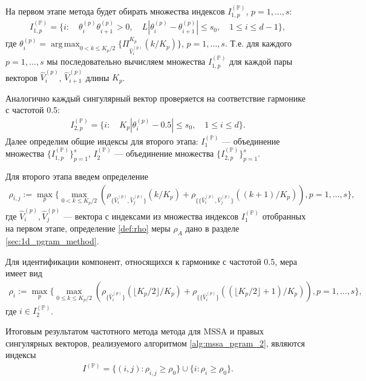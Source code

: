 \documentclass[specialist,
               substylefile = spbu.rtx,
               subf,href,colorlinks=true, 12pt]{disser}
\def\argmax{\mathop{\mathrm{argmax}}}
\def\argmax{\mathop{\mathrm{arg\,max}}}
\begin{document}
На первом этапе метода будет обирать множества индексов $I_{1,p}^{(\mathbb{P})}$, $p=1,\ldots,s$:
\begin{gather} \label{eq:I_1_P_mssa}
I_{1,p}^{(\mathbb{P})} = \{ i: \quad \theta_{i}^{(p)} \theta_{i+1} ^{(p)} >0, \quad L |\theta_i^{(p)} - \theta_{i+1}^{(p)}| \leqslant s_0, \quad 1 \leqslant i \leqslant d -1  \},
\end{gather}
где $\theta_i^{(p)} = \argmax_{0 < k \leqslant K_p/2} \{\Pi_{\widehat{V}_i^{(p)}}^{K_p}(k/{K_p})\}$, $p=1,\ldots,s$.
Т.е. для каждого $p = 1,\ldots,s$
мы последовательно вычисляем множества $I_{1,p}^{(\mathbb{P})}$ для каждой пары векторов  $\widehat{V}_i^{(p)}$, $\widehat{V}_{i+1}^{(p)}$ длины $K_p$.

Аналогично каждый сингулярный вектор проверяется на соответствие гармонике с частотой 0.5:
\begin{gather} \label{eq:I_2_P_mssa}
I_{2,p}^{(\mathbb{P})} = \{i: \quad  {K_p} |\theta_{i}^{(p)} - 0.5 | \leqslant s_0, \quad 1 \leqslant i \leqslant d  \}.
\end{gather}
Далее определим общие индексы для второго этапа: $I_1^{(\mathbb{P})}$ --- объединение множества $\{ I_{1,p}^{(\mathbb{P})} \}_{p=1}^{s}$, $I_2^{(\mathbb{P})}$ --- объединение множества $\{ I_{2,p}^{(\mathbb{P})} \}_{p=1}^{s}$.

Для второго этапа введем определение
\begin{gather*}
\rho_{i,j} :=  \max_p \{ \max_{0 < k \leqslant {K_p}/2}{\left(\rho_{\{\widehat{V}_i^{(p)}, \widehat{V}_{j}^{(p)}\}}(k/{K_p}) + \rho_{\{\{\widehat{V}_i^{(p)}, \widehat{V}_{j}^{(p)}\}}((k+1)/{K_p})\right)}, p=1,\ldots, s
 \},
\end{gather*}
где $\widehat{V}_i^{(p)}, \widehat{V}_{j}^{(p)}$ --- вектора с индексами из множества индексов $I_1^{(\mathbb{P})}$ отобранных на первом этапе,
определение \ref{def:rho} меры $\rho_A$ дано в разделе \ref{sec:1d_pgram_method}.

Для идентификации компонент, относящихся к гармонике с частотой 0.5, мера имеет вид
\begin{gather*}
\rho_{i} :=  \max_p \{ \max_{0 \leqslant k \leqslant {K_p}/2}{\left(\rho_{\{\widehat{V}_i^{(p)}\}}(\lfloor {K_p}/2 \rfloor/{K_p}) + \rho_{\{\{\widehat{V}_i^{(p)}\}}((\lfloor {K_p}/2 \rfloor + 1)/{K_p})\right)}, p=1,\ldots, s
 \},
\end{gather*}
где $i \in I_2^{(\mathbb{P})}$.

Итоговым результатом частотного метода метода для MSSA и правых сингулярных векторов, реализуемого алгоритмом \ref{alg:mssa_pgram_2}, являются индексы 
\begin{gather} \label{eq:pgram_I_p_mssa_2}
I^{(\mathbb{P})} = \{ (i,j): \rho_{i,j} \geqslant\rho_0 \} \cup \{ i: \rho_{i} \geqslant\rho_0 \}.
\end{gather}
\end{document}
